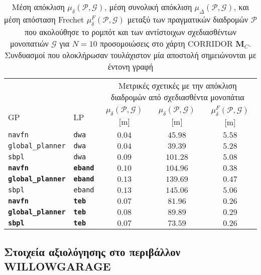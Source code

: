\begin{table}[h]
\renewcommand{\arraystretch}{1.3}
\begin{tabular}{llccc}
  & & \multicolumn{3}{c}{Μετρικές σχετικές με την απόκλιση διαδρομών από σχεδιασθέντα μονοπάτια} \\
  \cline{3-5}
  GP & LP & $\mu_{\delta}(\bm{\mathcal{P}},\bm{\mathcal{G}})$ [m] & $\mu_{\delta}(\bm{\mathcal{P}},\bm{\mathcal{G}})$ [m] & $\mu_{\delta}^F(\bm{\mathcal{P}},\bm{\mathcal{G}})$ [m] \\ \toprule
  \texttt{navfn} & \texttt{dwa} & $0.04$ & $45.98$ & $5.58$ \\
  \texttt{global\_planner} & \texttt{dwa} & $0.04$ & $39.39$ & $5.28$ \\
  \texttt{sbpl} & \texttt{dwa} & $0.09$ & $101.28$ & $5.08$ \\
  \textbf{\texttt{navfn}} & \textbf{\texttt{eband}} & $\bm{0.10}$ & $\bm{104.96}$ & $\bm{0.38}$ \\
  \textbf{\texttt{global\_planner}} & \textbf{\texttt{eband}} & $\bm{0.13}$ & $\bm{139.69}$ & $\bm{0.47}$ \\
  \texttt{sbpl} & \texttt{eband} & $0.13$ & $145.06$ & $5.06$ \\
  \textbf{\texttt{navfn}} & \textbf{\texttt{teb}} & $\bm{0.07}$ & $\bm{81.96}$ & $\bm{0.26}$ \\
  \textbf{\texttt{global\_planner}} & \textbf{\texttt{teb}} & $\bm{0.08}$ & $\bm{89.89}$ & $\bm{0.29}$ \\
  \textbf{\texttt{sbpl}} & \textbf{\texttt{teb}} & $\bm{0.07}$ & $\bm{73.59}$ & $\bm{0.26}$ \\ \bottomrule
\end{tabular}
\caption{\small Μέση απόκλιση $\mu_{\delta}(\bm{\mathcal{P}},\bm{\mathcal{G}})$,
         μέση συνολική απόκλιση
         $\mu_{\Delta}(\bm{\mathcal{P}},\bm{\mathcal{G}})$, και μέση απόσταση
         Frechet $\mu_{\delta}^F(\bm{\mathcal{P}},\bm{\mathcal{G}})$ μεταξύ των
         πραγματικών διαδρομών $\bm{\mathcal{P}}$ που ακολούθησε το ρομπότ και
         των αντίστοιχων σχεδιασθέντων μονοπατιών $\bm{\mathcal{G}}$ για $N=10$
         προσομοιώσεις στο χάρτη CORRIDOR $\bm{M}_C$. Συνδυασμοί που
         ολοκλήρωσαν τουλάχιστον μία αποστολή σημειώνονται με έντονη γραφή}
\label{tbl:info_deviation_from_global_plan_corridor}
\end{table}




\subsection{Στοιχεία αξιολόγησης στο περιβάλλον WILLOWGARAGE}
\label{appendix:evaluation_willowgarage}

